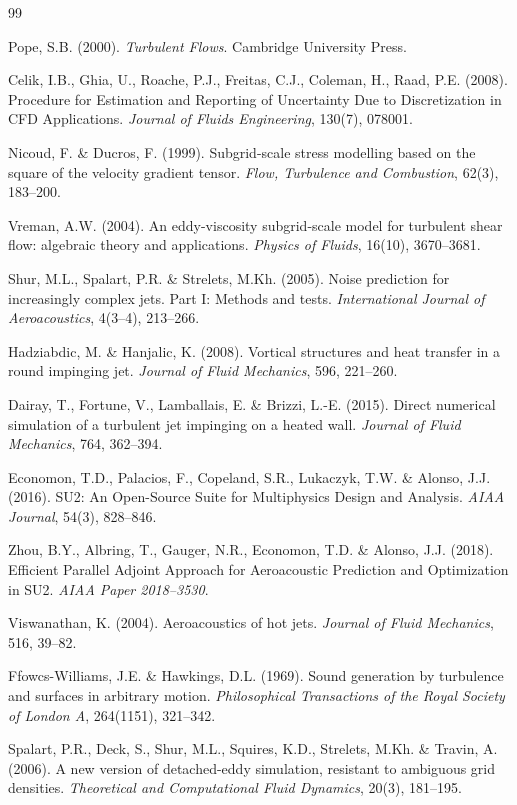 \documentclass[11pt,a4paper]{article}
\begin{document}
\newpage
\begin{thebibliography}{99}
\small

  Pope, S.B. (2000).
  \textit{Turbulent Flows}.
  Cambridge University Press.

  Celik, I.B., Ghia, U., Roache, P.J., Freitas, C.J., Coleman, H., Raad, P.E. (2008).
  Procedure for Estimation and Reporting of Uncertainty Due to Discretization in CFD Applications.
  \textit{Journal of Fluids Engineering}, 130(7), 078001.

  Nicoud, F. \& Ducros, F. (1999).
  Subgrid-scale stress modelling based on the square of the velocity gradient tensor.
  \textit{Flow, Turbulence and Combustion}, 62(3), 183--200.

  Vreman, A.W. (2004).
  An eddy-viscosity subgrid-scale model for turbulent shear flow:
  algebraic theory and applications.
  \textit{Physics of Fluids}, 16(10), 3670--3681.

  Shur, M.L., Spalart, P.R. \& Strelets, M.Kh. (2005).
  Noise prediction for increasingly complex jets. Part I: Methods and tests.
  \textit{International Journal of Aeroacoustics}, 4(3--4), 213--266.

  Hadziabdic, M. \& Hanjalic, K. (2008).
  Vortical structures and heat transfer in a round impinging jet.
  \textit{Journal of Fluid Mechanics}, 596, 221--260.

  Dairay, T., Fortune, V., Lamballais, E. \& Brizzi, L.-E. (2015).
  Direct numerical simulation of a turbulent jet impinging on a heated wall.
  \textit{Journal of Fluid Mechanics}, 764, 362--394.

  Economon, T.D., Palacios, F., Copeland, S.R., Lukaczyk, T.W. \& Alonso, J.J. (2016).
  SU2: An Open-Source Suite for Multiphysics Design and Analysis.
  \textit{AIAA Journal}, 54(3), 828--846.

  Zhou, B.Y., Albring, T., Gauger, N.R., Economon, T.D. \& Alonso, J.J. (2018).
  Efficient Parallel Adjoint Approach for Aeroacoustic Prediction and Optimization in SU2.
  \textit{AIAA Paper 2018--3530}.

  Viswanathan, K. (2004).
  Aeroacoustics of hot jets.
  \textit{Journal of Fluid Mechanics}, 516, 39--82.

  Ffowcs-Williams, J.E. \& Hawkings, D.L. (1969).
  Sound generation by turbulence and surfaces in arbitrary motion.
  \textit{Philosophical Transactions of the Royal Society of London A},
  264(1151), 321--342.

  Spalart, P.R., Deck, S., Shur, M.L., Squires, K.D., Strelets, M.Kh. \& Travin, A. (2006).
  A new version of detached-eddy simulation, resistant to ambiguous grid densities.
  \textit{Theoretical and Computational Fluid Dynamics}, 20(3), 181--195.

\end{thebibliography}
\end{document}
